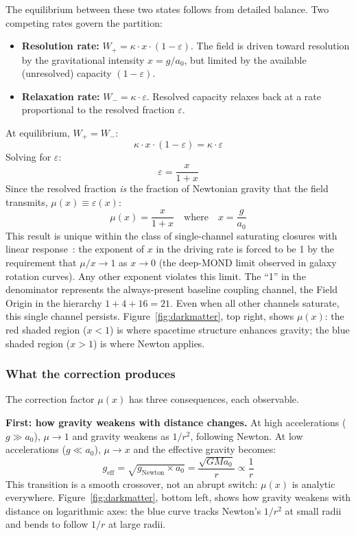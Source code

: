 \documentclass[aps,prd,preprint,superscriptaddress,showpacs,preprintnumbers,amsmath,amssymb,nofootinbib]{revtex4-2}
\begin{document}
The equilibrium between these two states follows from detailed balance. Two competing rates govern the partition:
\begin{itemize}
\item \textbf{Resolution rate:} $W_+ = \kappa \cdot x \cdot (1 - \varepsilon)$. The field is driven toward resolution by the gravitational intensity $x = g/a_0$, but limited by the available (unresolved) capacity $(1 - \varepsilon)$.
\item \textbf{Relaxation rate:} $W_- = \kappa \cdot \varepsilon$. Resolved capacity relaxes back at a rate proportional to the resolved fraction $\varepsilon$.
\end{itemize}
At equilibrium, $W_+ = W_-$:
\begin{equation}
\kappa \cdot x \cdot (1 - \varepsilon) = \kappa \cdot \varepsilon
\end{equation}
Solving for $\varepsilon$:
\begin{equation}
\varepsilon = \frac{x}{1 + x}
\end{equation}
Since the resolved fraction \emph{is} the fraction of Newtonian gravity that the field transmits, $\mu(x) \equiv \varepsilon(x)$:
\begin{equation}
\mu(x) = \frac{x}{1+x} \quad \text{where} \quad x = \frac{g}{a_0}
\label{eq:mu-dm}
\end{equation}
This result is unique within the class of single-channel saturating closures with linear response~\cite{paper1}: the exponent of $x$ in the driving rate is forced to be 1 by the requirement that $\mu/x \to 1$ as $x \to 0$ (the deep-MOND limit observed in galaxy rotation curves). Any other exponent violates this limit. The ``1'' in the denominator represents the always-present baseline coupling channel, the Field Origin in the hierarchy $1 + 4 + 16 = 21$. Even when all other channels saturate, this single channel persists. Figure~\ref{fig:darkmatter}, top right, shows $\mu(x)$: the red shaded region ($x < 1$) is where spacetime structure enhances gravity; the blue shaded region ($x > 1$) is where Newton applies.

\subsubsection*{What the correction produces}

The correction factor $\mu(x)$ has three consequences, each observable.

\textbf{First: how gravity weakens with distance changes.} At high accelerations ($g \gg a_0$), $\mu \to 1$ and gravity weakens as $1/r^2$, following Newton. At low accelerations ($g \ll a_0$), $\mu \to x$ and the effective gravity becomes:
\begin{equation}
g_{\text{eff}} = \sqrt{g_{\text{Newton}} \times a_0} = \frac{\sqrt{G M a_0}}{r} \propto \frac{1}{r}
\label{eq:deep-mond}
\end{equation}
This transition is a smooth crossover, not an abrupt switch: $\mu(x)$ is analytic everywhere. Figure~\ref{fig:darkmatter}, bottom left, shows how gravity weakens with distance on logarithmic axes: the blue curve tracks Newton's $1/r^2$ at small radii and bends to follow $1/r$ at large radii.
\end{document}
